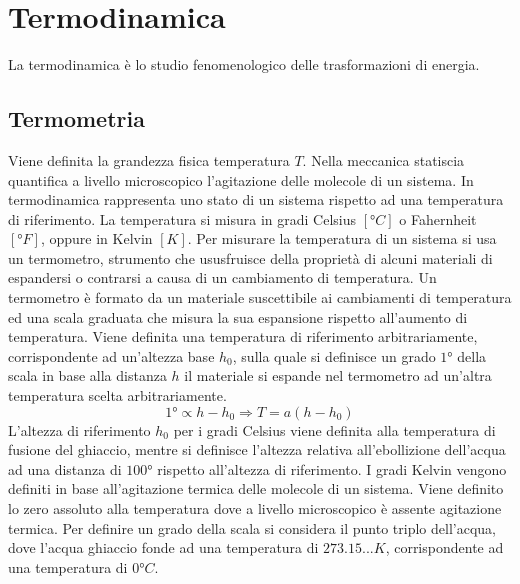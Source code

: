 \documentclass{article}
\numberwithin{equation}{subsection}
\begin{document}
\clearpage

\section{Termodinamica}
La termodinamica è lo studio fenomenologico delle 
trasformazioni di energia. \\

\subsection{Termometria}
Viene definita la grandezza fisica temperatura $T$. Nella 
meccanica statiscia
quantifica a livello microscopico l'agitazione delle molecole 
di un sistema. In termodinamica rappresenta uno stato di un  
sistema rispetto ad una temperatura di riferimento. La 
temperatura si misura in gradi Celsius $\left[\mbox{°}C\right]$ o 
Fahernheit $\left[\mbox{°}F\right]$, oppure in Kelvin $\left[K\right]$. 
Per misurare la temperatura di un sistema si usa un termometro, 
strumento che ususfruisce della proprietà di alcuni materiali di 
espandersi o contrarsi a causa di un cambiamento di temperatura.  
Un termometro è formato da un materiale suscettibile ai cambiamenti 
di temperatura ed una scala graduata che misura la sua 
espansione rispetto all'aumento di temperatura. Viene definita 
una temperatura di riferimento arbitrariamente, corrispondente 
ad un'altezza base $h_0$, sulla quale 
si definisce un grado $1\mbox{°}$ della scala in base alla distanza $h$  
il materiale si espande nel termometro ad un'altra temperatura 
scelta arbitrariamente.
\begin{equation}
    1\mbox{°}\propto h-h_0\Rightarrow T=a(h-h_0)
\end{equation}
L'altezza di riferimento $h_0$ per i gradi Celsius viene definita 
alla temperatura di fusione del ghiaccio, mentre si definisce 
l'altezza relativa all'ebollizione dell'acqua ad una distanza 
di $100\mbox{°}$ rispetto all'altezza di riferimento.
I gradi Kelvin vengono definiti in base 
all'agitazione termica delle molecole di un sistema. Viene 
definito lo zero assoluto alla temperatura dove a livello 
microscopico è assente agitazione termica. Per definire un grado 
della scala si considera il punto triplo dell'acqua, dove 
l'acqua ghiaccio fonde ad una temperatura di $273.15...K$, 
corrispondente ad una temperatura di $0\mbox{°}C$. 
\begin{center}\end{center}
\end{document}
